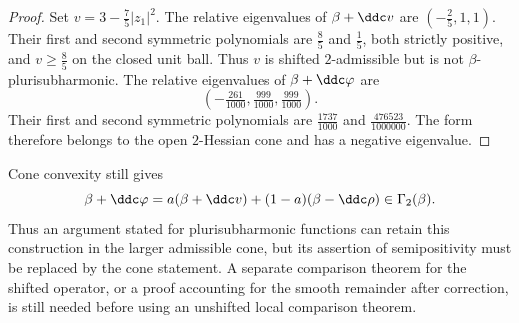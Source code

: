 \begin{proof}
Set $v=3-\tfrac75|z_1|^2$. The relative eigenvalues of
$\beta+\ddc v$ are $(-\tfrac25,1,1)$.
Their first and second symmetric polynomials are $\tfrac85$ and
$\tfrac15$, both strictly positive, and $v\geq\tfrac85$ on the
closed unit ball. Thus $v$ is shifted $2$-admissible but is not
$\beta$-plurisubharmonic.
The relative eigenvalues of $\beta+\ddc\varphi$ are
\[
 \left(-\tfrac{261}{1000},\tfrac{999}{1000},
       \tfrac{999}{1000}\right).
\]
Their first and second symmetric polynomials are
$\tfrac{1737}{1000}$ and $\tfrac{476523}{1000000}$.
The form therefore belongs to the open $2$-Hessian cone and has
a negative eigenvalue.
\end{proof}

Cone convexity still gives
\[
 \beta+\ddc\varphi
 =a(\beta+\ddc v)+(1-a)(\beta-\ddc\rho)
 \in\Gamma_2(\beta).
\]
Thus an argument stated for plurisubharmonic functions can retain
this construction in the larger admissible cone, but its assertion
of semipositivity must be replaced by the cone statement. A separate
comparison theorem for the shifted operator, or a proof accounting
for the smooth remainder after correction, is still needed before
using an unshifted local comparison theorem.
